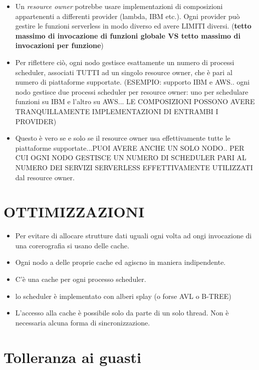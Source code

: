 \documentclass[10pt,a4paper]{article}
\begin{document}
\begin{itemize}
\item Un \textit{resource owner} potrebbe usare implementazioni di composizioni appartenenti a differenti provider (lambda, IBM etc.). Ogni provider può gestire le funzioni serverless in modo diverso ed avere LIMITI diversi. (\textbf{tetto massimo di invocazione di funzioni globale VS tetto massimo di invocazioni per funzione})

\item Per riflettere ciò, ogni nodo gestisce esattamente un numero di processi scheduler, associati TUTTI ad un singolo resource owner, che è pari al numero di piattaforme supportate. (ESEMPIO: supporto IBM e AWS.. ogni nodo gestisce due processi scheduler per resource owner: uno per schedulare funzioni su IBM e l'altro su AWS... LE COMPOSIZIONI POSSONO AVERE TRANQUILLAMENTE IMPLEMENTAZIONI DI ENTRAMBI I PROVIDER)

\item Questo è vero se e solo se il resource owner usa effettivamente tutte le piattaforme supportate...PUOI AVERE ANCHE UN SOLO NODO.. PER CUI OGNI NODO GESTISCE UN NUMERO DI SCHEDULER PARI AL NUMERO DEI SERVIZI SERVERLESS EFFETTIVAMENTE UTILIZZATI dal resource owner.

\end{itemize}

\section{OTTIMIZZAZIONI}

\begin{itemize}
\item Per evitare di allocare strutture dati uguali ogni volta ad ongi invocazione di una corerografia si usano delle cache.

\item Ogni nodo a delle proprie cache ed agiscno in maniera indipendente.

\item C'è una cache per ogni processo scheduler.

\item lo scheduler è implementato con alberi splay (o forse AVL o B-TREE)

\item L'accesso alla cache è possibile solo da parte di un solo thread. Non è necessaria alcuna forma di sincronizzazione.
\end{itemize}

\section{Tolleranza ai guasti}
\end{document}
